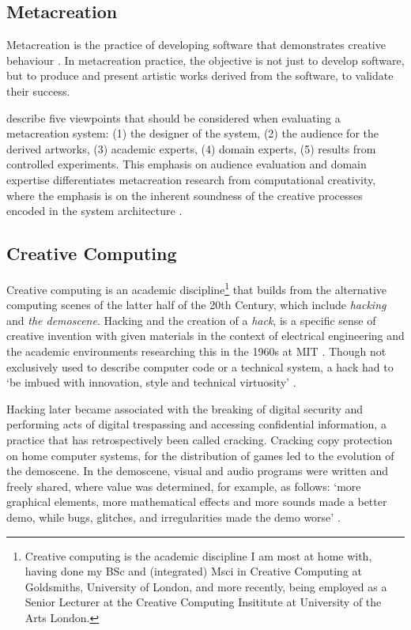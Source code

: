 \subsection{Metacreation}

Metacreation is the practice of developing software that demonstrates creative behaviour \citep{whitelaw2004metacreation}. 
In metacreation practice, the objective is not just to develop software, but to produce and present artistic works derived from the software, to validate their success. 

\cite{eigenfeldt2012evaluating} describe five viewpoints that should be considered when evaluating a metacreation system: (1) the designer of the system, (2) the audience for the derived artworks, (3) academic experts, (4) domain experts, (5) results from controlled experiments.
This emphasis on audience evaluation and domain expertise differentiates metacreation research from computational creativity, where the emphasis is on the inherent soundness of the creative processes encoded in the system architecture \citep{colton2008creativity}.

\subsection{Creative Computing}

Creative computing is an academic discipline\footnote{Creative computing is the academic discipline I am most at home with, having done my BSc and (integrated) Msci in Creative Computing at Goldsmiths, University of London, and more recently, being employed as a Senior Lecturer at the Creative Computing Insititute at University of the Arts London.}
that builds from the alternative computing scenes of the latter half of the 20th Century, which include \textit{hacking} and \textit{the demoscene}. 
Hacking and the creation of a \textit{hack}, is a specific sense of creative invention with given materials in the context of electrical engineering and the academic environments researching this in the 1960s at MIT \citep{wark2006hackers}. 
Though not exclusively used to describe computer code or a technical system, a hack had to `be imbued with innovation, style and technical virtuosity' \citep{levy1984hackers}.

Hacking later became associated with the breaking of digital security and performing acts of digital trespassing and accessing confidential information, a practice that has retrospectively been called cracking. 
Cracking copy protection on home computer systems, for the distribution of games led to the evolution of the demoscene. 
 In the demoscene, visual and audio programs were written and freely shared, where value was determined, for example, as follows: ‘more graphical elements, more mathematical effects and more sounds made a better demo, while bugs, glitches, and irregularities made the demo worse’ \citep{carlsson2019forgotten}.

